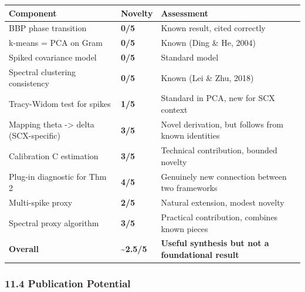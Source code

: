 \documentclass[
  12pt,
]{article}
\begin{document}
\begin{longtable}[]{@{}
  >{\raggedright\arraybackslash}p{}
  >{\raggedright\arraybackslash}p{}
  >{\raggedright\arraybackslash}p{}@{}}
\toprule\noalign{}
\begin{minipage}[b]{\linewidth}\raggedright
Component
\end{minipage} & \begin{minipage}[b]{\linewidth}\raggedright
Novelty
\end{minipage} & \begin{minipage}[b]{\linewidth}\raggedright
Assessment
\end{minipage} \\
\midrule\noalign{}
\endhead
\bottomrule\noalign{}
\endlastfoot
BBP phase transition & \textbf{0/5} & Known result, cited correctly \\
k-means = PCA on Gram & \textbf{0/5} & Known (Ding \& He, 2004) \\
Spiked covariance model & \textbf{0/5} & Standard model \\
Spectral clustering consistency & \textbf{0/5} & Known (Lei \& Zhu,
2018) \\
Tracy-Widom test for spikes & \textbf{1/5} & Standard in PCA, new for
SCX context \\
Mapping theta -\textgreater{} delta (SCX-specific) & \textbf{3/5} &
Novel derivation, but follows from known identities \\
Calibration C estimation & \textbf{3/5} & Technical contribution,
bounded novelty \\
Plug-in diagnostic for Thm 2 & \textbf{4/5} & Genuinely new connection
between two frameworks \\
Multi-spike proxy & \textbf{2/5} & Natural extension, modest novelty \\
Spectral proxy algorithm & \textbf{3/5} & Practical contribution,
combines known pieces \\
\textbf{Overall} & \textbf{\textasciitilde2.5/5} & \textbf{Useful
synthesis but not a foundational result} \\
\end{longtable}

\subsubsection{11.4 Publication Potential}\label{publication-potential}
\end{document}
